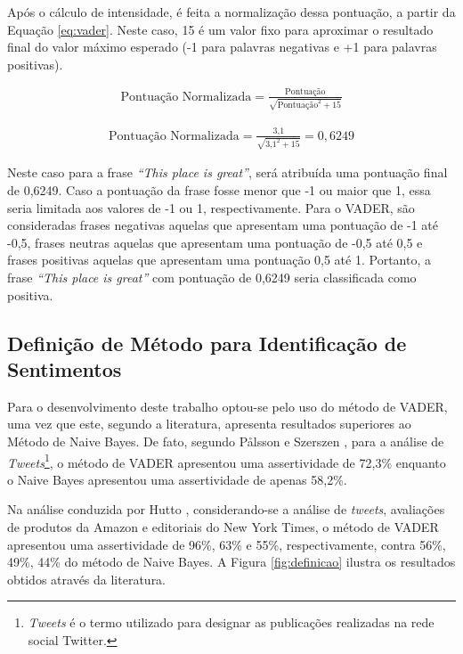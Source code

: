 Após o cálculo de intensidade, é feita a normalização dessa
pontuação, a partir da Equação \ref{eq:vader}. Neste caso, 15 é um valor
fixo para aproximar o resultado final do valor máximo esperado (-1 para
palavras negativas e +1 para palavras positivas).

\begin{equation}
\begin{gathered}
\text{Pontuação Normalizada}
=
\frac{\text{Pontuação}}{\sqrt{\text{Pontuação}^2 + 15}}
\label{eq:vader}
\end{gathered}
\end{equation}


\begin{equation}
\begin{gathered}
\text{Pontuação Normalizada}
=
\frac{\text{3,1}}{\sqrt{\text{3,1}^2 + 15}} = 0,6249
\label{eq:vaderscore}
\end{gathered}
\end{equation}

Neste caso para a frase \textit{``This place is great''}, será
atribuída uma pontuação final de 0,6249.  Caso a
pontuação da frase fosse menor que -1 ou maior que 1, essa seria limitada aos
valores de -1 ou 1, respectivamente. Para o \ac{VADER}, são consideradas frases negativas
aquelas que apresentam uma pontuação de -1 até -0,5, frases neutras aquelas que
apresentam uma pontuação de -0,5 até 0,5 e frases positivas aquelas que
apresentam uma pontuação 0,5 até 1.
Portanto, a frase \textit{``This place is great''} com pontuação de 0,6249 seria
classificada como positiva.

\subsection{Definição de Método para Identificação de Sentimentos}

Para o desenvolvimento deste trabalho optou-se pelo uso do método de \ac{VADER},
uma vez que este, segundo a literatura, apresenta resultados superiores ao
Método de Naive Bayes. De fato, segundo Pålsson e Szerszen
\cite{SentimentinSocialMedia}, para a análise de \textit{Tweets}\footnote{\textit{Tweets} é o termo utilizado
para designar as publicações realizadas na rede social Twitter.}, o método de
\ac{VADER} apresentou uma assertividade de 72,3\% enquanto o Naive Bayes apresentou uma assertividade de apenas 58,2\%.

Na análise conduzida por Hutto \cite{conf/icwsm/HuttoG14},
considerando-se a análise de \textit{tweets}, avaliações de produtos da Amazon e
editoriais do New York Times, o método de \ac{VADER} apresentou uma assertividade de 96\%, 63\% e 55\%, respectivamente, contra
56\%, 49\%, 44\% do método de Naive Bayes. A Figura \ref{fig:definicao} ilustra
os resultados obtidos através da literatura.

